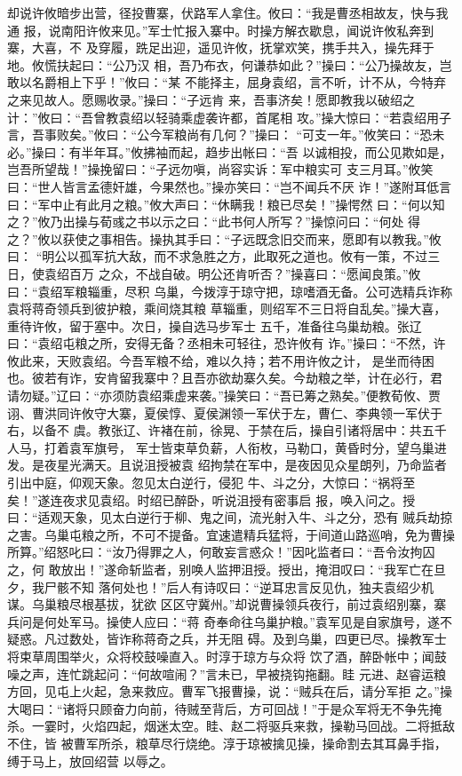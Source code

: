 却说许攸暗步出营，径投曹寨，伏路军人拿住。攸曰：“我是曹丞相故友，快与我通
报，说南阳许攸来见。”军士忙报入寨中。时操方解衣歇息，闻说许攸私奔到寨，大喜，不
及穿履，跣足出迎，遥见许攸，抚掌欢笑，携手共入，操先拜于地。攸慌扶起曰：“公乃汉
相，吾乃布衣，何谦恭如此？”操曰：“公乃操故友，岂敢以名爵相上下乎！”攸曰：“某
不能择主，屈身袁绍，言不听，计不从，今特弃之来见故人。愿赐收录。”操曰：“子远肯
来，吾事济矣！愿即教我以破绍之计：”攸曰：“吾曾教袁绍以轻骑乘虚袭许都，首尾相
攻。”操大惊曰：“若袁绍用子言，吾事败矣。”攸曰：“公今军粮尚有几何？”操曰：
“可支一年。”攸笑曰：“恐未必。”操曰：有半年耳。”攸拂袖而起，趋步出帐曰：“吾
以诚相投，而公见欺如是，岂吾所望哉！”操挽留曰：“子远勿嗔，尚容实诉：军中粮实可
支三月耳。”攸笑曰：“世人皆言孟德奸雄，今果然也。”操亦笑曰：“岂不闻兵不厌
诈！”遂附耳低言曰：“军中止有此月之粮。”攸大声曰：“休瞒我！粮已尽矣！”操愕然
曰：“何以知之？”攸乃出操与荀彧之书以示之曰：“此书何人所写？”操惊问曰：“何处
得之？”攸以获使之事相告。操执其手曰：“子远既念旧交而来，愿即有以教我。”攸曰：
“明公以孤军抗大敌，而不求急胜之方，此取死之道也。攸有一策，不过三日，使袁绍百万
之众，不战自破。明公还肯听否？”操喜曰：“愿闻良策。”攸曰：“袁绍军粮辎重，尽积
乌巢，今拨淳于琼守把，琼嗜酒无备。公可选精兵诈称袁将蒋奇领兵到彼护粮，乘间烧其粮
草辎重，则绍军不三日将自乱矣。”操大喜，重待许攸，留于塞中。次日，操自选马步军士
五千，准备往乌巢劫粮。张辽曰：“袁绍屯粮之所，安得无备？丞相未可轻往，恐许攸有
诈。”操曰：“不然，许攸此来，天败袁绍。今吾军粮不给，难以久持；若不用许攸之计，
是坐而待困也。彼若有诈，安肯留我寨中？且吾亦欲劫寨久矣。今劫粮之举，计在必行，君
请勿疑。”辽曰：“亦须防袁绍乘虚来袭。”操笑曰：“吾已筹之熟矣。”便教荀攸、贾
诩、曹洪同许攸守大寨，夏侯惇、夏侯渊领一军伏于左，曹仁、李典领一军伏于右，以备不
虞。教张辽、许褚在前，徐晃、于禁在后，操自引诸将居中：共五千人马，打着袁军旗号，
军士皆束草负薪，人衔枚，马勒口，黄昏时分，望乌巢进发。是夜星光满天。且说沮授被袁
绍拘禁在军中，是夜因见众星朗列，乃命监者引出中庭，仰观天象。忽见太白逆行，侵犯
牛、斗之分，大惊曰：“祸将至矣！”遂连夜求见袁绍。时绍已醉卧，听说沮授有密事启
报，唤入问之。授曰：“适观天象，见太白逆行于柳、鬼之间，流光射入牛、斗之分，恐有
贼兵劫掠之害。乌巢屯粮之所，不可不提备。宜速遣精兵猛将，于间道山路巡哨，免为曹操
所算。”绍怒叱曰：“汝乃得罪之人，何敢妄言惑众！”因叱监者曰：“吾令汝拘囚之，何
敢放出！”遂命斩监者，别唤人监押沮授。授出，掩泪叹曰：“我军亡在旦夕，我尸骸不知
落何处也！”后人有诗叹曰：“逆耳忠言反见仇，独夫袁绍少机谋。乌巢粮尽根基拔，犹欲
区区守冀州。”却说曹操领兵夜行，前过袁绍别寨，寨兵问是何处军马。操使人应曰：“蒋
奇奉命往乌巢护粮。”袁军见是自家旗号，遂不疑惑。凡过数处，皆诈称蒋奇之兵，并无阻
碍。及到乌巢，四更已尽。操教军士将束草周围举火，众将校鼓噪直入。时淳于琼方与众将
饮了酒，醉卧帐中；闻鼓噪之声，连忙跳起问：“何故喧闹？”言未已，早被挠钩拖翻。眭
元进、赵睿运粮方回，见屯上火起，急来救应。曹军飞报曹操，说：“贼兵在后，请分军拒
之。”操大喝曰：“诸将只顾奋力向前，待贼至背后，方可回战！”于是众军将无不争先掩
杀。一霎时，火焰四起，烟迷太空。眭、赵二将驱兵来救，操勒马回战。二将抵敌不住，皆
被曹军所杀，粮草尽行烧绝。淳于琼被擒见操，操命割去其耳鼻手指，缚于马上，放回绍营
以辱之。

